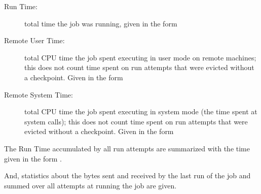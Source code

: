 \begin{description}
\item[Run Time:] total time the job was running,
given in the form 

\item[Remote User Time:] total CPU time the job spent
executing in user mode on remote machines; 
this does not count time spent on run attempts that were evicted 
without a checkpoint.
Given in the form 

\item[Remote System Time:] total CPU time the job spent
executing in system mode (the time spent at system calls);
this does not count time spent on run attempts that were evicted 
without a checkpoint.  
Given in the form 

\end{description}

The Run Time accumulated by all run attempts are summarized with
the time given in the form .

And, statistics about the bytes sent and received by the last
run of the job and summed over all attempts at running the job
are given.
